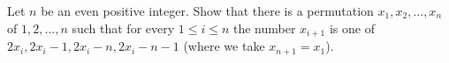 Let $n$ be an even positive integer. Show that there is a permutation $x_1, x_2, \ldots, x_n$ of $1, 2, \ldots, n$ such that for every $1 \leq i \leq n$ the number $x_{i+1}$ is one of $2x_i, 2x_i - 1, 2x_i - n, 2x_i - n - 1$ (where we take $x_{n+1} = x_1$).
